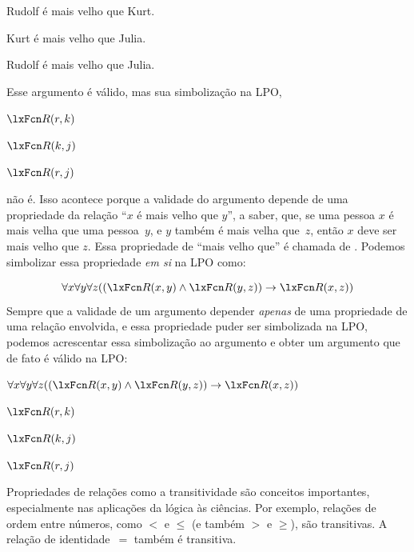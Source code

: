 \begin{earg}
\item Rudolf é mais velho que Kurt.
\item Kurt é mais velho que Julia.
\item[\texttherefore] Rudolf é mais velho que Julia.
\end{earg}
Esse argumento é válido, mas sua simbolização na LPO,
\begin{earg}
	\item $\atom{R}{r,k}$
	\item $\atom{R}{k,j}$
	\item[\texttherefore] $\atom{R}{r,j}$
\end{earg}
não é. Isso acontece porque a validade do argumento depende de uma propriedade da relação \textquotedblleft $x$ é mais velho que $y$\textquotedblright{}, a saber, que, se uma pessoa $x$ é mais velha que uma pessoa~$y$, e $y$ também é mais velha que~$z$, então $x$ deve ser mais velho que $z$. Essa propriedade de \textquotedblleft mais velho que\textquotedblright{} é chamada de . Podemos simbolizar essa propriedade \emph{em si} na LPO como:





\[
	\forall x\forall y\forall z((\atom{R}{x,y} \eand \atom{R}{y,z}) \eif
	\atom{R}{x,z})
\]
Sempre que a validade de um argumento depender \emph{apenas} de uma propriedade de uma relação envolvida, e essa propriedade puder ser simbolizada na LPO, podemos acrescentar essa simbolização ao argumento e obter um argumento que de fato é válido na LPO:



\begin{earg}
	\item $\forall x\forall y\forall z((\atom{R}{x,y} \eand \atom{R}{y,z}) \eif
	\atom{R}{x,z})$
	\item $\atom{R}{r,k}$
	\item $\atom{R}{k,j}$
	\item[\texttherefore] $\atom{R}{r,j}$
\end{earg}

Propriedades de relações como a transitividade são conceitos importantes, especialmente nas aplicações da lógica às ciências. Por exemplo, relações de ordem entre números, como $<$ e $\le$ (e também $>$ e $\ge$), são transitivas. A relação de identidade~$=$ também é transitiva.





